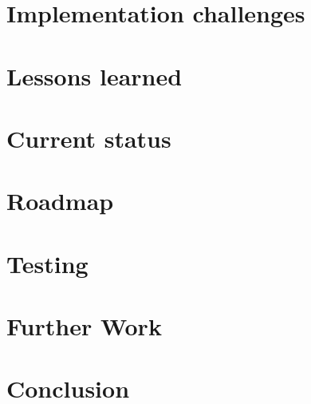\documentclass[10pt, conference, compsocconf]{IEEEtran}
\begin{document}
\section{Implementation challenges}
\label{sec:challenges}


\section{Lessons learned}
\label{sec:lessons}


\section{Current status}
\label{sec:status}


\section{Roadmap}
\label{sec:roadmap}


\section{Testing}
\label{sec:testing}


\section{Further Work}
\label{sec:further}


\section{Conclusion}
\label{sec:conclusion}




\end{document}
